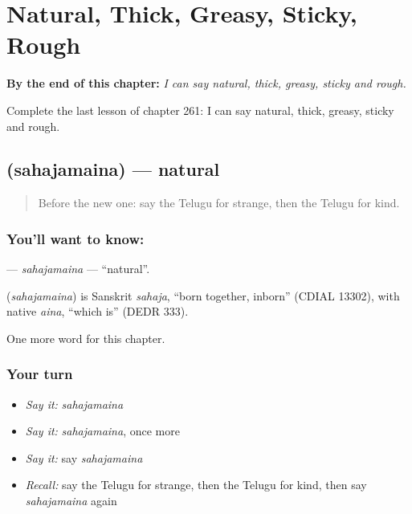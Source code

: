 
\chapter{Natural, Thick, Greasy, Sticky, Rough}
\label{ch:te-natural-thick-greasy-sticky-rough}

\begin{chapteropening}
\textbf{By the end of this chapter:} \emph{I can say natural, thick, greasy, sticky and rough.}

Complete the last lesson of chapter 261: I can say natural, thick, greasy, sticky and rough.
\end{chapteropening}

\section[\texorpdfstring{\te{సహజమైన} (sahajamaina)}{సహజమైన (sahajamaina)}]{ (sahajamaina) — natural}

\label{lesson:TE-C261-sahajamaina}



\begin{quote}
Before the new one: say the Telugu for strange, then the Telugu for kind.
\end{quote}

\subsection*{You'll want to know: }
\textbf{} — \emph{sahajamaina} — \textquotedblleft{}natural\textquotedblright{}.

\begin{cousinweb}
\textbf{} (\emph{sahajamaina}) is Sanskrit \emph{sahaja}, \textquotedblleft{}born together, inborn\textquotedblright{} (CDIAL 13302), with native \emph{aina}, \textquotedblleft{}which is\textquotedblright{} (DEDR 333).
\end{cousinweb}

\begin{grammarlens}[title={What you've built}]
One more word for this chapter.
\end{grammarlens}

\subsection*{Your turn}
\begin{itemize}
\raggedright
  \item \emph{Say it:} \emph{sahajamaina}
  \item \emph{Say it:} \emph{sahajamaina}, once more
  \item \emph{Say it:} say \emph{sahajamaina}
  \item \emph{Recall:} say the Telugu for strange, then the Telugu for kind, then say \emph{sahajamaina} again
\end{itemize}

